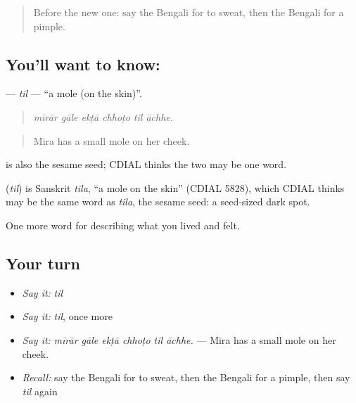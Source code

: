 \begin{quote}
Before the new one: say the Bengali for to sweat, then the Bengali for a pimple.
\end{quote}

\subsection*{You'll want to know: }
\textbf{} — \emph{til} — \textquotedblleft{}a mole (on the skin)\textquotedblright{}.

\begin{quote}
     
\end{quote}

\begin{quote}
\emph{mīrār gāle ekṭā chhoṭo til āchhe.}
\end{quote}

\begin{quote}
Mira has a small mole on her cheek.
\end{quote}

 is also the sesame seed; CDIAL thinks the two may be one word.

\begin{cousinweb}
\textbf{} (\emph{til}) is Sanskrit \emph{tila}, \textquotedblleft{}a mole on the skin\textquotedblright{} (CDIAL 5828), which CDIAL thinks may be the same word as \emph{tila}, the sesame seed: a seed-sized dark spot.
\end{cousinweb}

\begin{grammarlens}[title={What you've built}]
One more word for describing what you lived and felt.
\end{grammarlens}

\subsection*{Your turn}
\begin{itemize}
\raggedright
  \item \emph{Say it:} \emph{til}
  \item \emph{Say it:} \emph{til}, once more
  \item \emph{Say it:} \emph{mīrār gāle ekṭā chhoṭo til āchhe.} — Mira has a small mole on her cheek.
  \item \emph{Recall:} say the Bengali for to sweat, then the Bengali for a pimple, then say \emph{til} again
\end{itemize}

